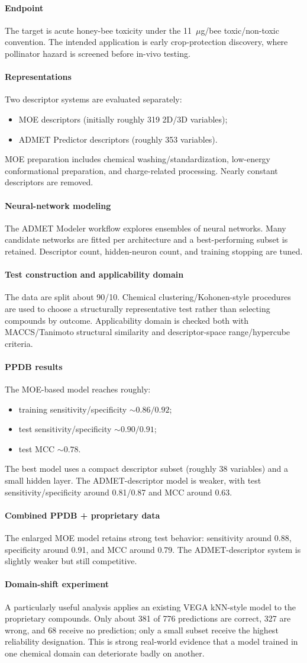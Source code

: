 \documentclass[11pt]{article}
\newcommand{\reviewfield}[2]{\paragraph{#1}#2}
\begin{document}
\reviewfield{Endpoint}{
The target is acute honey-bee toxicity under the 11~$\mu$g/bee toxic/non-toxic convention. The intended application is early crop-protection discovery, where pollinator hazard is screened before in-vivo testing.
}

\reviewfield{Representations}{
Two descriptor systems are evaluated separately:
\begin{itemize}
    \item MOE descriptors (initially roughly 319 2D/3D variables);
    \item ADMET Predictor descriptors (roughly 353 variables).
\end{itemize}
MOE preparation includes chemical washing/standardization, low-energy conformational preparation, and charge-related processing. Nearly constant descriptors are removed.
}

\reviewfield{Neural-network modeling}{
The ADMET Modeler workflow explores ensembles of neural networks. Many candidate networks are fitted per architecture and a best-performing subset is retained. Descriptor count, hidden-neuron count, and training stopping are tuned.
}

\reviewfield{Test construction and applicability domain}{
The data are split about 90/10. Chemical clustering/Kohonen-style procedures are used to choose a structurally representative test rather than selecting compounds by outcome. Applicability domain is checked both with MACCS/Tanimoto structural similarity and descriptor-space range/hypercube criteria.
}

\reviewfield{PPDB results}{
The MOE-based model reaches roughly:
\begin{itemize}
    \item training sensitivity/specificity $\sim0.86/0.92$;
    \item test sensitivity/specificity $\sim0.90/0.91$;
    \item test MCC $\sim0.78$.
\end{itemize}
The best model uses a compact descriptor subset (roughly 38 variables) and a small hidden layer. The ADMET-descriptor model is weaker, with test sensitivity/specificity around 0.81/0.87 and MCC around 0.63.
}

\reviewfield{Combined PPDB + proprietary data}{
The enlarged MOE model retains strong test behavior: sensitivity around 0.88, specificity around 0.91, and MCC around 0.79. The ADMET-descriptor system is slightly weaker but still competitive.
}

\reviewfield{Domain-shift experiment}{
A particularly useful analysis applies an existing VEGA kNN-style model to the proprietary compounds. Only about 381 of 776 predictions are correct, 327 are wrong, and 68 receive no prediction; only a small subset receive the highest reliability designation. This is strong real-world evidence that a model trained in one chemical domain can deteriorate badly on another.
}
\end{document}
